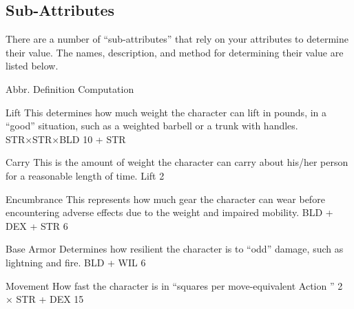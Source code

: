 \documentclass[twoside]{book}
\begin{document}
\subsection{Sub-Attributes}
     There are a number of “sub-attributes”
               that rely on your attributes to determine their value. The
               names, description, and method for determining their value
               are listed below.   
                
                  
                   Abbr.   
                   Definition   
                   Computation   
                  
                  
                   Lift   
                     This determines how much weight the character
                     can lift in pounds, in a “good”
                     situation, such as a weighted barbell or a trunk
                     with handles. 
                           STR×STR×BLD
                        10      +   
                     STR   
                    
                  
                  
                   Carry   
                     This is the amount of weight the character can
                     carry about his/her person for a reasonable length
                     of time. 
                           Lift    2  
                       
                    
                  
                  
                   Encumbrance   
                     This represents how much gear the character
                     can wear before encountering adverse effects due to
                     the weight and impaired mobility. 
                             BLD  +
                      DEX  +  STR  
                        6     
                    
                  
                  
                   Base Armor   
                     Determines how resilient the character is to
                     “odd” damage, such as lightning and
                     fire. 
                           BLD  +
                      WIL    6    
                     
                    
                  
                  
                   Movement   
                     How fast the character is in “squares
                     per move-equivalent Action ” 
                           2  ×
                      STR  +  DEX 
                       15     
                    
\end{document}
